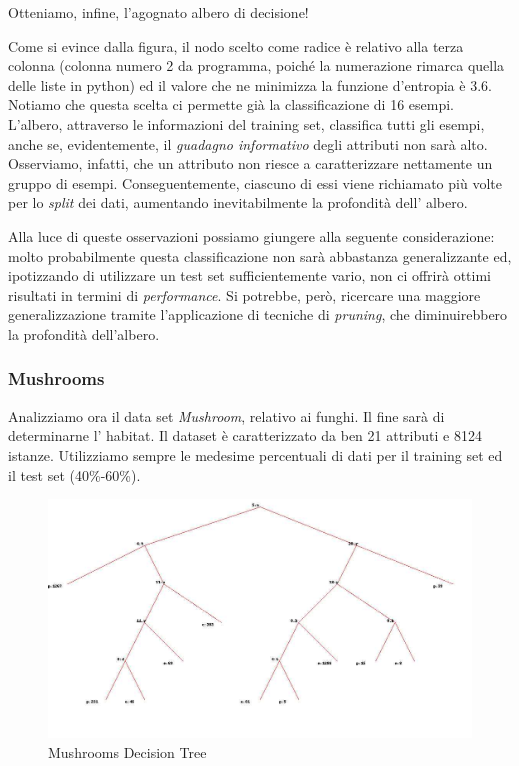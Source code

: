 			Otteniamo, infine, l'agognato albero di decisione!\par
			Come si evince dalla figura, il nodo scelto come radice è relativo alla terza colonna (colonna numero 2 da programma, poiché la numerazione rimarca quella delle liste in python) ed il valore che ne minimizza la funzione d'entropia è 3.6. Notiamo che questa scelta ci permette già la classificazione di 16 esempi.
			L'albero, attraverso le informazioni del training set, classifica tutti gli esempi, anche se, evidentemente, il \emph{guadagno informativo} degli attributi non sarà alto. Osserviamo, infatti, che un attributo non riesce a caratterizzare nettamente un gruppo di esempi. Conseguentemente, ciascuno di essi viene richiamato più volte per lo \emph{split} dei dati, aumentando inevitabilmente la profondità dell' albero.\par
			Alla luce di queste osservazioni possiamo giungere alla seguente considerazione: molto probabilmente questa classificazione non sarà abbastanza generalizzante ed, ipotizzando di utilizzare un test set sufficientemente vario, non ci offrirà ottimi risultati in termini di \emph{performance}. Si potrebbe, però, ricercare una maggiore generalizzazione tramite l'applicazione di tecniche di \emph{pruning}, che diminuirebbero la profondità dell'albero.\par
		\subsubsection{Mushrooms} 
			Analizziamo ora il data set \emph{Mushroom}, relativo ai funghi. Il fine sarà di determinarne l' habitat. Il dataset è caratterizzato da ben 21 attributi e 8124 istanze. Utilizziamo sempre le medesime percentuali di dati per il training set ed il test set (40\%-60\%).
			
			\begin{figure}
				\includegraphics[width=1.2\textwidth, height=0.9\textheight]{mushroom.jpg}
				\caption{Mushrooms Decision Tree}
				\label{fig:mus-dt}
			\end{figure}
			
